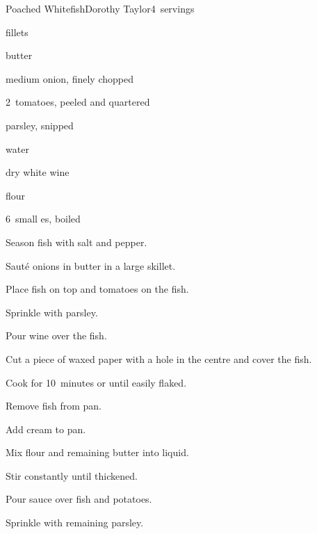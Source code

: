 \begin{recipe}{Poached Whitefish}{Dorothy Taylor}{4~servings}

\begin{ingredients}
\item \lbs{1\threequarter}  fillets
\item {}
\item {}
\item {} butter
\item medium onion, finely chopped
\item 2~tomatoes, peeled and quartered
\item \C{\quarter} parsley, snipped
\item \C{\third} water
\item \C{\third} dry white wine
\item \C{\third} 
\item {} flour
\item 6~small es, boiled
\end{ingredients}

\begin{directions}
\item Season fish with salt and pepper.
\item Sauté onions in  butter in a large skillet.
\item Place fish on top and tomatoes on the fish.
\item Sprinkle with  parsley.
\item Pour wine over the fish.
\item Cut a piece of waxed paper with a hole in the centre and cover the fish.
\item Cook for 10~minutes or until easily flaked.
\item Remove fish from pan.
\item Add cream to pan.
\item Mix flour and remaining butter into liquid.
\item Stir constantly until thickened.
\item Pour sauce over fish and potatoes.
\item Sprinkle with remaining parsley.
\end{directions}

\end{recipe}
